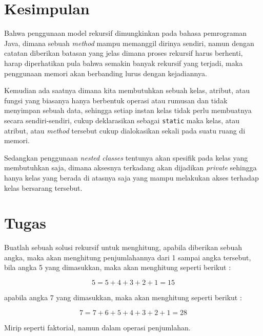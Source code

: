 \section{Kesimpulan}

Bahwa penggunaan model rekursif dimungkinkan pada bahasa pemrograman Java, dimana sebuah \textit{method} mampu memanggil dirinya sendiri, namun dengan catatan diberikan batasan yang jelas dimana proses rekursif harus berhenti, harap diperhatikan pula bahwa semakin banyak rekursif yang terjadi, maka penggunaan memori akan berbanding lurus dengan kejadiannya.

Kemudian ada saatnya dimana kita membutuhkan sebuah kelas, atribut, atau fungsi yang biasanya hanya berbentuk operasi atau rumusan dan tidak menyimpan sebuah data, sehingga setiap instan kelas tidak perlu membuatnya secara sendiri-sendiri, cukup deklarasikan sebagai \texttt{static} maka kelas, atau atribut, atau \textit{method} tersebut cukup dialokasikan sekali pada suatu ruang di memori.

Sedangkan penggunaan \textit{nested classes} tentunya akan spesifik pada kelas yang membutuhkan saja, dimana aksesnya terkadang akan dijadikan \textit{private} sehingga hanya kelas yang berada di atasnya saja yang mampu melakukan akses terhadap kelas bersarang tersebut.

\section{Tugas}

Buatlah sebuah solusi rekursif untuk menghitung, apabila diberikan sebuah angka, maka akan menghitung penjumlahannya dari 1 sampai angka tersebut, bila angka 5 yang dimasukkan, maka akan menghitung seperti berikut : 

\[5 = 5 + 4 + 3 + 2 + 1 = 15 \]

apabila angka 7 yang dimasukkan, maka akan menghitung seperti berikut :

\[ 7 = 7 + 6 + 5 + 4 + 3 + 2 + 1 = 28 \]

Mirip seperti faktorial, namun dalam operasi penjumlahan.